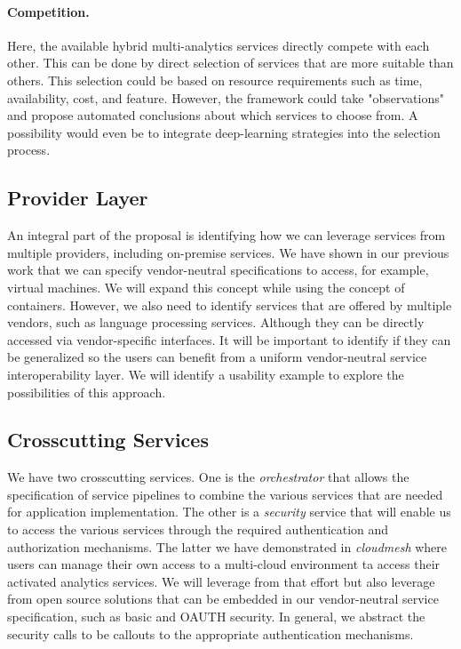 \paragraph{Competition.} Here, the available hybrid multi-analytics services
directly compete with each other. This can be done by direct selection
of services that are more suitable than others. This selection could
be based on resource requirements such as time, availability, cost,
and feature. However, the framework could take "observations" and
propose automated conclusions about which services to choose from. A
possibility would even be to integrate deep-learning strategies into
the selection process.
  

\subsection{Provider Layer}

An integral part of the proposal is identifying how we can leverage
services from multiple providers, including on-premise services. We
have shown in our previous work that we can specify vendor-neutral
specifications to access, for example, virtual machines. We will expand
this concept while using the concept of containers. However, we also
need to identify services that are offered by
multiple vendors, such as language processing services. Although they
can be directly accessed via vendor-specific interfaces. It will
be important to identify if they can be generalized so the users
can benefit from a uniform vendor-neutral service interoperability
layer. We will identify a usability example to explore the
possibilities of this approach.

\subsection{Crosscutting Services}

We have two crosscutting services. One is the {\em orchestrator} that
allows the specification of service pipelines to combine the various
services that are needed for application implementation. The other
is a {\em security} service that will enable us to access the various services
through the required authentication and authorization mechanisms. The
latter we have demonstrated in {\em cloudmesh} where users can manage their
own access to a multi-cloud environment ta access their activated
analytics services. We will leverage from that effort but  also leverage from
open source solutions that can be embedded in our vendor-neutral
service specification, such as basic and OAUTH security. In general, we
abstract the security calls to be callouts to the appropriate
authentication mechanisms.

